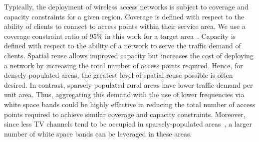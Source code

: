 Typically, the deployment of wireless access networks is subject to coverage and capacity
constraints for a given region. Coverage is defined with respect to the ability of
clients to connect to access points within their service area.  We use a coverage
constraint ratio of $95\%$ in this work for a target area~\cite{robinson2010deploying}.
Capacity is defined with respect to the ability of a network to serve the traffic 
demand of clients.  Spatial reuse allows improved capacity but increases the cost
of deploying a network by increasing the total number of access points required.
Hence, for densely-populated areas, the greatest level of spatial reuse possible
is often desired.  In contrast, sparsely-populated rural areas have lower traffic
demand per unit area.  Thus, aggregating this demand with the use of lower frequencies via white 
space bands could be highly effective in reducing the total number of access points 
required to achieve similar coverage and capacity constraints.  Moreover, since
less TV channels tend to be occupied in sparsely-populated areas~\cite{msdatabase}, 
a larger number of white space bands can be leveraged in these areas.



